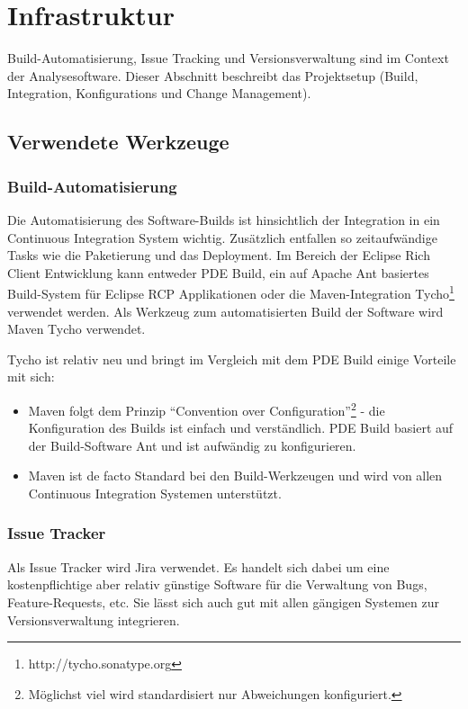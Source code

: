 \chapter{Infrastruktur}\label{konzept_3}
Build-Automatisierung, Issue Tracking und Versionsverwaltung sind im Context der Analysesoftware. Dieser Abschnitt beschreibt das Projektsetup (Build, Integration, Konfigurations und Change Management).

\section{Verwendete Werkzeuge}
\subsection{Build-Automatisierung}
Die Automatisierung des Software-Builds ist hinsichtlich der Integration in ein Continuous Integration System wichtig. Zusätzlich entfallen so zeitaufwändige Tasks wie die Paketierung und das Deployment. Im Bereich der Eclipse Rich Client Entwicklung kann entweder PDE Build, ein auf Apache Ant basiertes Build-System für Eclipse RCP Applikationen\cite{vogelZapfPdeBuild} oder die Maven-Integration Tycho\footnote{http://tycho.sonatype.org} verwendet werden. Als Werkzeug zum automatisierten Build der Software wird Maven Tycho verwendet.

Tycho ist relativ neu und bringt im Vergleich mit dem PDE Build einige Vorteile mit sich:
\begin{itemize}
	\item Maven folgt dem Prinzip ``Convention over Configuration''\footnote{Möglichst viel wird standardisiert nur Abweichungen konfiguriert.} - die Konfiguration des Builds ist einfach und verständlich. PDE Build basiert auf der Build-Software Ant und ist aufwändig zu konfigurieren.
	\item Maven ist de facto Standard bei den Build-Werkzeugen und wird von allen Continuous Integration Systemen unterstützt.
\end{itemize}

\subsection{Issue Tracker}\label{issue_tracker}
Als Issue Tracker wird Jira verwendet. Es handelt sich dabei um eine kostenpflichtige aber relativ günstige Software für die Verwaltung von Bugs, Feature-Requests, etc. Sie lässt sich auch gut mit allen gängigen Systemen zur Versionsverwaltung integrieren.

